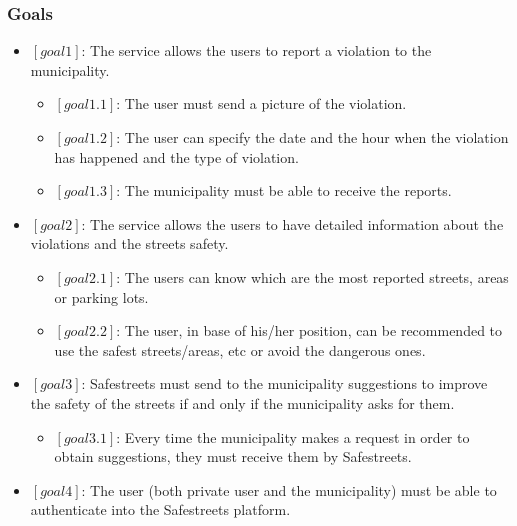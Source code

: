 \documentclass[titlepage]{article}
\begin{document}
\subsubsection{Goals}
\begin{itemize}
\item $[goal 1]$:  The service allows the users to report a violation to the municipality.
\begin{itemize}

	\item $[goal 1.1]$: The user must send a picture of the 			violation.
	
	\item $[goal 1.2]$: The user can specify the date and the 						hour when the violation has happened 							and the type of violation.
	

	\item $[goal 1.3]$: The municipality must be able to     	receive the reports.  \\
	
\end{itemize}

\item $[goal 2]$: The service allows the users to have detailed information about the violations and the streets safety.
      \begin{itemize}
      	\item $[goal 2.1]$: The users can know which are the 			most reported streets, areas or parking lots.
		
		\item $[goal 2.2]$: The user, in base of his/her 				position, can be recommended to use the safest 					streets/areas, etc or avoid the dangerous ones.\\

      \end{itemize}

\item $[goal 3]$: Safestreets must send to the municipality suggestions to improve the safety of the streets if and only if the municipality asks for them.
	\begin{itemize}
	\item $[goal 3.1]$: Every time the municipality makes a request in order to obtain suggestions, they must receive them by Safestreets.
					   
	
	\end{itemize}
\item $[goal 4]$: The user (both private user and the municipality) must be able to authenticate into the Safestreets platform.


\end{itemize}
\end{document}
